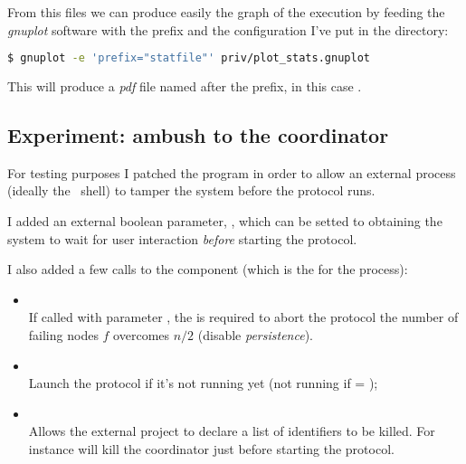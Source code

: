 From this files we can produce easily the graph of the execution by
feeding the \emph{gnuplot} software with the prefix and the configuration
I've put in the  directory:
\begin{lstlisting}[language=bash]
$ gnuplot -e 'prefix="statfile"' priv/plot_stats.gnuplot
\end{lstlisting}

This will produce a \emph{pdf} file named after the prefix, in this case
. 

\subsection{Experiment: ambush to the coordinator}

For testing purposes I patched the program in order to allow an external
process (ideally the \Erlang\ shell) to tamper the system before the
protocol runs.

I added an external boolean parameter, , which
can be setted to  obtaining the system to wait for user
interaction \emph{before} starting the protocol.

I also added a few calls to the  component (which is
the  for the process):
\begin{itemize}
\item   {} \\
        If called with parameter , the  is
        required to abort the protocol the number of failing nodes $f$
        overcomes $n/2$ (disable \emph{persistence}).
\item   {} \\
        Launch the protocol if it's not running yet
        (not running if  = );
\item   {} \\
        Allows the external project to declare a list of identifiers to be
        killed. For instance  will kill the
        coordinator just before starting the protocol.
\end{itemize}

